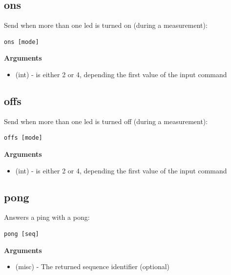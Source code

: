 \subsection{ons}
\label{appendix/led-protocol:ons}\label{appendix/led-protocol:protocol-output-ons}
Send when more than one led is turned on (during a measurement):

\begin{verbatim}
ons [mode]
\end{verbatim}

\textbf{Arguments}
\begin{itemize}
\item {} 
 (int) - is either 2 or 4, depending the first value of the  input command

\end{itemize}


\subsection{offs}
\label{appendix/led-protocol:protocol-output-offs}\label{appendix/led-protocol:offs}
Send when more than one led is turned off (during a measurement):

\begin{verbatim}
offs [mode]
\end{verbatim}

\textbf{Arguments}
\begin{itemize}
\item {} 
 (int) - is either 2 or 4, depending the first value of the  input command

\end{itemize}


\subsection{pong}
\label{appendix/led-protocol:pong}\label{appendix/led-protocol:protocol-output-pong}
Answers a ping with a pong:

\begin{verbatim}
pong [seq]
\end{verbatim}

\textbf{Arguments}
\begin{itemize}
\item {} 
 (misc) - The returned sequence identifier (optional)

\end{itemize}


